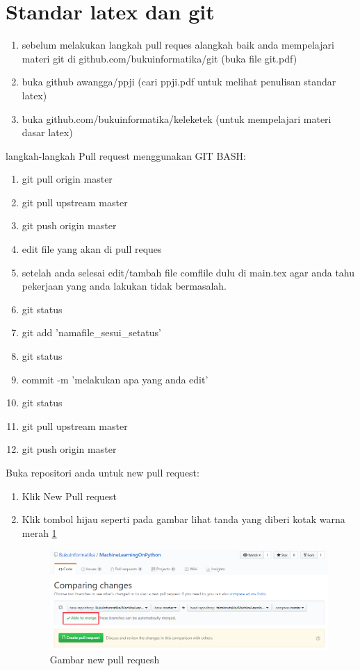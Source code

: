 \section{Standar latex dan git}

\begin{enumerate}
\item sebelum melakukan langkah pull reques alangkah baik anda mempelajari materi git di github.com/bukuinformatika/git (buka file git.pdf)
\item buka github awangga/ppji (cari ppji.pdf untuk melihat penulisan standar latex)
\item buka github.com/bukuinformatika/keleketek (untuk mempelajari materi dasar latex)
\end{enumerate}

 langkah-langkah Pull request menggunakan GIT BASH:
\begin{enumerate}
\item git pull origin master
\item git pull upstream master
\item git push origin master
\item edit file yang akan di pull reques
\item setelah anda selesai edit/tambah file comflile dulu di main.tex agar anda tahu pekerjaan yang anda lakukan tidak bermasalah.
\item git status
\item git add 'namafile\_sesui\_setatus'
\item git status 
\item commit -m 'melakukan apa yang anda edit'
\item git status
\item git pull upstream master
\item git push origin master
\end{enumerate}

Buka repositori anda untuk new pull request:
\begin{enumerate}
\item Klik New Pull request
\item Klik tombol hijau seperti pada gambar lihat tanda yang diberi kotak warna merah \ref{labelgambar1} 
		\begin{figure}[htbp]
		\centering
		\includegraphics[width=1\textwidth]{figures/1.PNG}
		\caption{Gambar new pull requesh}
		\label{labelgambar1}
		\end{figure}	 
\end{enumerate}